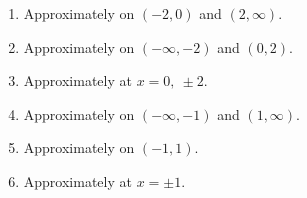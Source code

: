 {%
\begin{minipage}{\linewidth}\end{minipage}
}
{	\begin{enumerate}
\item		Approximately on $(-2,0)$ and $(2,\infty)$.
\item		Approximately on $(-\infty,-2)$ and $(0,2)$.
\item		Approximately at $x=0,\ \pm 2$.
\item		Approximately on $(-\infty,-1)$ and $(1,\infty)$.
\item		Approximately on $(-1,1)$.
\item		Approximately at $x=\pm 1$.
\end{enumerate}
}
